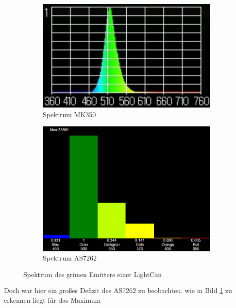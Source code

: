 \documentclass[11pt]{scrartcl}
\begin{document}
\begin{figure}[H]
    \centering
    \begin{subfigure}[b]{0.49\textwidth}
        \includegraphics[width=\textwidth]{images/mk350_lightcan_green_spectrum.png}
        \caption{Spektrum MK350}\label{fig:green_spec_MK350}
    \end{subfigure}
    \hfill 
    \begin{subfigure}[b]{0.49\textwidth}
        \includegraphics[width=\textwidth]{images/app_lightcan_green_spectrum.png}
        \caption{Spektrum AS7262}\label{fig:green_spec_7262}
    \end{subfigure}
    \caption{Spektrum des grünen Emitters einer LightCan}
\end{figure}
\noindent
Doch war hier ein großes Defizit des AS7262 zu beobachten. wie in Bild  \ref{fig:green_spec_MK350} zu erkennen liegt für das Maximum
\end{document}
